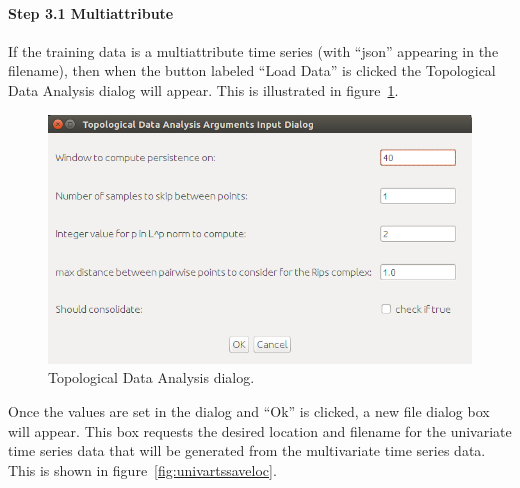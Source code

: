 \documentclass[titlepage, letterpaper, 12pt]{article}
\begin{document}
\paragraph{Step 3.1 Multiattribute}

If the training data is a multiattribute time series (with ``json'' appearing in the filename), then when the button labeled ``Load Data'' is clicked the Topological Data Analysis dialog will appear.  This is illustrated in figure~\ref{fig:tda-args-dialog}. 

\begin{figure}
	\centering
	\includegraphics[width=\textwidth]{pictures/TDA-args-dialog}
	\caption{Topological Data Analysis dialog.}
	\label{fig:tda-args-dialog}
\end{figure}

Once the values are set in the dialog and ``Ok'' is clicked, a new file dialog box will appear.  This box requests the desired location and filename for the univariate time series data that will be generated from the multivariate time series data.  This is shown in figure~\ref{fig:univartssaveloc}.
\end{document}
